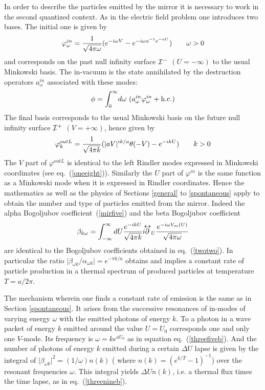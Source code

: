 \documentclass[12pt,oneside]{report}
\def\lrpartial{\mathrel{\partial\kern-.75em\raise1.75ex
\hbox{$\leftrightarrow$}}}
\def\om{\omega	}
\begin{document}
In order to describe the particles emitted by the mirror it
is necessary to work in the second quantized context. As in
the electric field problem one introduces two bases. The
initial one is given by
\begin{equation}
\varphi^{in}_\omega = {1 \over \sqrt{4 \pi \omega}}(e^{-i
\omega V} - e^{
-i \omega a^{-1} e^{-aU}})\qquad \omega > 0
\label{mireight}
\end{equation}
and corresponds on the past null infinity surface  ${\cal I^-}$ $(U=-\infty)$
 to the usual Minkowski basis. The in-vacuum is the state annihilated by the
destruction operators $a_\omega^{in}$ associated with these modes:
\begin{equation}
\phi= \int_0^\infty \!d \omega\ ( a^{in}_\omega
\varphi^{in}_\omega + {\rm h.c.} ) \label{mirnine}
\end{equation}
The final basis corresponds  to the usual
Minkowski basis on the future null infinity surface ${\cal I^+}$ $(V=+\infty)$,
hence given by \begin{equation} \varphi_{k}^{out L} = {1 \over \sqrt{4 \pi
k}}(\vert aV \vert^{i k /a}\theta(-V) - e^{-i kU} )\qquad k > 0 \label{mirten}
\end{equation}
 The $V$ part of
$\varphi^{out L}$ is identical to the left 
Rindler modes expressed in Minkowski
coordinates (see eq.~(\ref{oneeight})). Similarly the $U$ part of
$\varphi^{in}$ is the same function as a Minkowski mode when it is expressed in
Rindler coordinates. Hence the mathematics as well as the physics of Sections
\ref{general} to \ref{spontaneous} apply to obtain the number and type of
particles emitted from the mirror. Indeed the alpha Bogoljubov
coefficient~(\ref{mirfive}) and the beta Bogoljubov coefficient 
\begin{equation}
\beta_{k \omega  } = 
\int^{\infty}_{-\infty} dU { e ^{-i k U}\over \sqrt{4 \pi k}} i {\lrpartial}_U
{e^{- i \omega V_m(U)} \over\sqrt{4 \pi \omega}}
\label{mirfiveB}
\end{equation}
are identical to the Bogoljubov coefficients obtained in eq.~(\ref{twotwo}).
In particular the ratio $\vert \beta_{\om k}/ \alpha_{\om k}
\vert = e^{-  \pi k / a}$
obtains and implies a constant rate of particle production in a thermal spectrum
of produced particles at temperature $T = a/ 2
\pi$. 

The mechanism wherein one finds a constant rate of
emission  is the same as in Section \ref{spontaneous}.
It arises from the successive  resonances of in-modes 
of varying energy $\omega$ with the emitted
photons of energy $k$.  To a photon in a wave packet of energy
$k$ emitted around the value $U=U_0$ corresponds
one and only one $V$-mode. Its frequency is $\omega = {k}e^{a
U_0}$ as in equation eq.~(\ref{threefiveb}). 
And the number of photons of energy $k$ emitted during a certain
$\Delta U$ lapse is given by the integral
of 
$ \vert \beta_{\om k} \vert^2 = (1 / \omega) n(k)$
(  where  $ n(k)=(e^{k/T} -1)^{-1}$)
over the resonant frequencies $\om$.
This integral yields $\Delta U  n(k)$, i.e. a thermal flux times 
the time lapse, as in eq.~(\ref{threenineb}).
\end{document}
